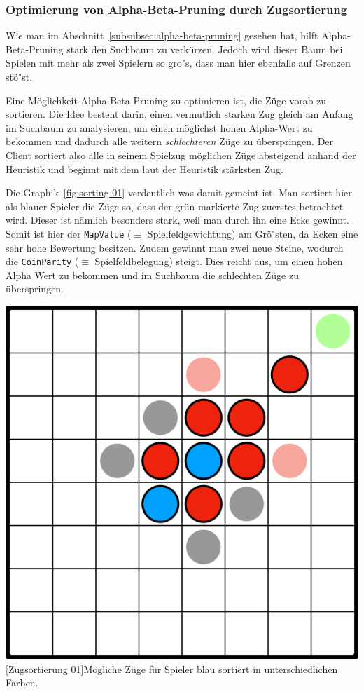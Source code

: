\newpage

\subsubsection{Optimierung von Alpha-Beta-Pruning durch Zugsortierung}\label{subsubsec:ab-optimierung}
Wie man im Abschnitt~\ref{subsubsec:alpha-beta-pruning} gesehen hat, hilft Alpha-Beta-Pruning stark den Suchbaum zu verk\"urzen.
Jedoch wird dieser Baum bei Spielen mit mehr als zwei Spielern so gro"s, dass man hier ebenfalls auf Grenzen st\"o"st.

Eine M\"oglichkeit Alpha-Beta-Pruning zu optimieren ist, die Z\"uge vorab zu sortieren.
Die Idee besteht darin, einen vermutlich starken Zug gleich am Anfang im Suchbaum zu analysieren, um einen m\"oglichst hohen Alpha-Wert zu bekommen und dadurch alle weitern \textit{schlechteren} Z\"uge zu \"uberspringen.
Der Client sortiert also alle in seinem Spielzug m\"oglichen Z\"uge absteigend anhand der Heuristik und beginnt mit dem laut der Heuristik st\"arksten Zug.

Die Graphik~\ref{fig:sorting-01} verdeutlich was damit gemeint ist.
Man sortiert hier als blauer Spieler die Z\"uge so, dass der gr\"un markierte Zug zuerstes betrachtet wird.
Dieser ist n\"amlich besonders stark, weil man durch ihn eine Ecke gewinnt.
Somit ist hier der \texttt{MapValue} ($\equiv$ Spielfeldgewichtung) am Gr\"o"sten, da Ecken eine sehr hohe Bewertung besitzen.
Zudem gewinnt man zwei neue Steine, wodurch die \texttt{CoinParity} ($\equiv$ Spielfeldbelegung) steigt.
Dies reicht aus, um einen hohen Alpha Wert zu bekommen und im Suchbaum die schlechten Z\"uge zu \"uberspringen.

\vspace{1em}
\begin{minipage}{\linewidth}
    \centering
    \includegraphics[width=0.45\linewidth]{pics/sorting-01}
    [Zugsortierung 01]{M\"ogliche Z\"uge f\"ur Spieler blau sortiert in unterschiedlichen Farben.}
    \label{fig:sorting-01}
\end{minipage}
\vspace{1em}

